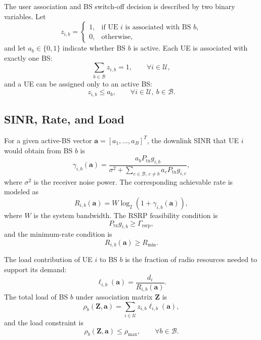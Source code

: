 \documentclass[journal]{IEEEtran}
\begin{document}
The user association and BS switch-off decision is described by two binary
variables. Let
\begin{equation}
    z_{i,b} =
    \begin{cases}
        1, & \text{if UE } i \text{ is associated with BS } b,\\
        0, & \text{otherwise,}
    \end{cases}
\end{equation}
and let $a_b\in\{0,1\}$ indicate whether BS $b$ is active. Each UE is
associated with exactly one BS:
\begin{equation}
    \sum_{b\in\mathcal{B}} z_{i,b}=1,\qquad \forall i\in\mathcal{U},
    \label{eq:association_constraint}
\end{equation}
and a UE can be assigned only to an active BS:
\begin{equation}
    z_{i,b}\leq a_b,\qquad \forall i\in\mathcal{U},\ b\in\mathcal{B}.
    \label{eq:active_constraint}
\end{equation}

\subsection{SINR, Rate, and Load}
For a given active-BS vector $\mathbf{a}=[a_1,\ldots,a_B]^T$, the downlink
SINR that UE $i$ would obtain from BS $b$ is
\begin{equation}
    \gamma_{i,b}(\mathbf{a}) =
    \frac{a_b P_{\mathrm{tx}} g_{i,b}}
    {\sigma^2 + \sum_{c\in\mathcal{B},\,c\neq b}
    a_c P_{\mathrm{tx}} g_{i,c}},
    \label{eq:sinr}
\end{equation}
where $\sigma^2$ is the receiver noise power. The corresponding achievable rate
is modeled as
\begin{equation}
    R_{i,b}(\mathbf{a}) =
    W\log_2\left(1+\gamma_{i,b}(\mathbf{a})\right),
    \label{eq:rate}
\end{equation}
where $W$ is the system bandwidth. The RSRP feasibility condition is
\begin{equation}
    P_{\mathrm{tx}} g_{i,b}\geq \Gamma_{\mathrm{rsrp}},
    \label{eq:rsrp}
\end{equation}
and the minimum-rate condition is
\begin{equation}
    R_{i,b}(\mathbf{a})\geq R_{\min}.
    \label{eq:qos}
\end{equation}

The load contribution of UE $i$ to BS $b$ is the fraction of radio resources
needed to support its demand:
\begin{equation}
    \ell_{i,b}(\mathbf{a}) =
    \frac{d_i}{R_{i,b}(\mathbf{a})}.
\end{equation}
The total load of BS $b$ under association matrix $\mathbf{Z}$ is
\begin{equation}
    \rho_b(\mathbf{Z},\mathbf{a}) =
    \sum_{i\in\mathcal{U}} z_{i,b}\ell_{i,b}(\mathbf{a}),
    \label{eq:load}
\end{equation}
and the load constraint is
\begin{equation}
    \rho_b(\mathbf{Z},\mathbf{a})\leq \rho_{\max},
    \qquad \forall b\in\mathcal{B}.
    \label{eq:load_constraint}
\end{equation}
\end{document}
